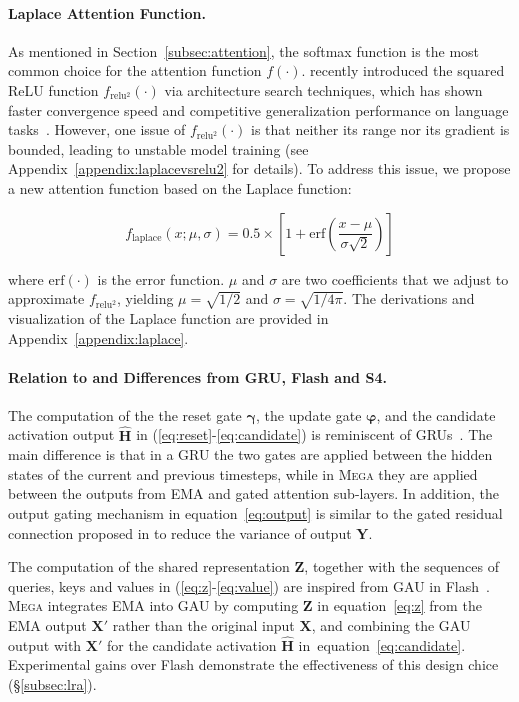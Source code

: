 \paragraph{Laplace Attention Function.} As mentioned in Section~\ref{subsec:attention}, the softmax function is the most common choice for the attention function $f(\cdot)$.
\citet{so2021searching} recently introduced the squared ReLU function $f_{\mathrm{relu^2}}(\cdot)$ via architecture search techniques, which has shown faster convergence speed and competitive generalization performance on language tasks~\citep{hua2022transformer}. However, one issue of $f_{\mathrm{relu^2}}(\cdot)$ is that neither its range nor its gradient is bounded, leading to unstable model training (see Appendix~\ref{appendix:laplacevsrelu2} for details). To address this issue, we propose a new attention function based on the Laplace function:

\begin{equation}
\label{eq:laplace}
f_{\mathrm{laplace}}(x; \mu,\sigma) = 0.5 \times \left[1 + \mathrm{erf}(\frac{x - \mu}{\sigma\sqrt{2}}) \right]
\end{equation}

where $\mathrm{erf}(\cdot)$ is the error function. 
$\mu$ and $\sigma$ are two coefficients that we adjust to approximate $f_{\mathrm{relu^2}}$, yielding $\mu=\sqrt{1/2}$ and $\sigma=\sqrt{1/4\pi}$.
The derivations and visualization of the Laplace function are provided in Appendix~\ref{appendix:laplace}.

\paragraph{Relation to and Differences from GRU, Flash and S4.} The computation of the the reset gate $\boldsymbol{\gamma}$, the update gate $\boldsymbol{\varphi}$, and the candidate activation output $\boldsymbol{\hat{H}}$ in (\ref{eq:reset}-\ref{eq:candidate}) is reminiscent of GRUs~\citep{cho2014properties}. The main difference is that in a GRU the two gates are applied between the hidden states of the current and previous timesteps, while in \textsc{Mega} they are applied between the outputs from EMA and gated attention sub-layers. In addition, the output gating mechanism in equation~\ref{eq:output} is similar to the gated residual connection proposed in \citet{parisotto2020stabilizing,xu2020transformer} to reduce the variance of output $\boldsymbol{Y}$.

The computation of the shared representation $\boldsymbol{Z}$, together with the sequences of queries, keys and values in (\ref{eq:z}-\ref{eq:value}) are inspired from GAU in Flash~\citep{hua2022transformer}.
\textsc{Mega} integrates EMA into GAU by computing $\boldsymbol{Z}$ in equation~\ref{eq:z} from the EMA output $\boldsymbol{X}'$ rather than the original input $\boldsymbol{X}$, and combining the GAU output with $\boldsymbol{X}'$ for the candidate activation $\boldsymbol{\hat{H}}$ in~equation~\ref{eq:candidate}. 
Experimental gains over Flash demonstrate the effectiveness of this design chice (\S\ref{subsec:lra}).

